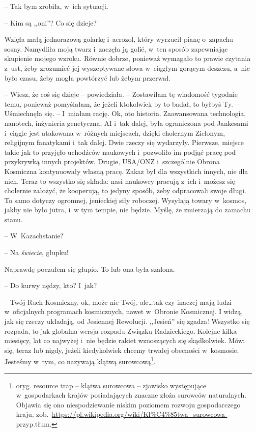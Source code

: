 \documentclass[oneside,polish,11pt,sfheadings]{mwbk}
\begin{document}
-- Tak bym zrobiła, w~ich sytuacji.

-- Kim są ,,oni''? Co się dzieje?

Wzięła małą jednorazową golarkę i~aerozol, który wyrzucił pianę o~zapachu sosny. Namydliła moją twarz i~zaczęła ją golić, w~ten sposób
zapewniając skupienie mojego wzroku. Równie dobrze, ponieważ wymagało
to prawie czytania z~ust, żeby zrozumieć jej wyszeptywane słowa w~ciągłym gorącym deszczu, a~nie było czasu, żeby mogła powtórzyć lub
żebym przerwał.

-- Wiesz, że coś się dzieje -- powiedziała. -- Zostawiłam tę wiadomość
tygodnie temu, ponieważ pomyślałam, że jeżeli ktokolwiek by to badał, to
byłbyś Ty. -- Uśmiechnęła się. -- I~miałam rację. Ok, oto historia. Zaawansowana technologia, nanotech, inżynieria genetyczna, AI i~tak
dalej, była ograniczona pod Jankesami i~ciągle jest atakowana w~różnych
miejscach, dzięki cholernym Zielonym, religijnym fanatykami i~tak dalej.
Dwie rzeczy się wydarzyły. Pierwsze, miejsce takie jak to przyjęło uchodźców
naukowych i~pozwoliło im podjąć pracę pod przykrywką innych projektów.
Drugie, USA/ONZ i~szczególnie Obrona Kosmiczna kontynuowały własną
pracę. Zakaz był dla wszystkich innych, nie dla nich. Teraz to wszystko
się składa: nasi naukowcy pracują z~ich i~możesz się cholernie
założyć, że kooperują, to jedyny sposób, żeby odpracowali swoje długi.
To samo dotyczy ogromnej, jenieckiej siły roboczej. Wysyłają towary w~kosmos, jakby nie było jutra, i~w tym tempie, nie będzie. Myślę, że
zmierzają do zamachu stanu.

-- W~Kazachstanie?

-- Na \emph{świecie}, głupku!

Naprawdę poczułem się głupio. To lub ona była szalona.

-- Do kurwy nędzy, kto? I~jak?

-- Twój Ruch Kosmiczny, ok, może nie Twój, ale\ldots tak czy inaczej mają
ludzi w~oficjalnych programach kosmicznych, nawet w~Obronie Kosmicznej.
I widzą, jak się rzeczy układają, od Jesiennej Rewolucji. ,,Jesień'' się
zgadza! Wszystko się rozpada, to jak globalna wersja rozpadu Związku
Radzieckiego. Kolejne kilka miesięcy, lat co najwyżej i~nie będzie
rakiet wznoszących się skądkolwiek. Mówi się, teraz lub nigdy, jeżeli
kiedykolwiek chcemy trwałej obecności w~kosmosie. Jesteśmy w~tym, co
nazywają klątwą surowcową\footnote{oryg. resource trap -- klątwa surowcowa -- zjawisko występujące w~gospodarkach krajów posiadających znaczne złoża
surowców naturalnych. Objawia się ono niespodziewanie niskim poziomem
rozwoju gospodarczego kraju,
zob.~\url{https://pl.wikipedia.org/wiki/Kl\%C4\%85twa_surowcowa
} -- przyp.tłum.}. 
\end{document}
